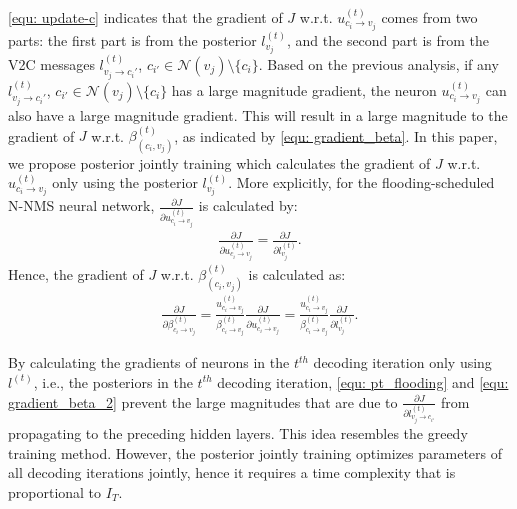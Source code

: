 \documentclass [PhD] {uclathes}
\begin{document}
\eqref{equ: update-c} indicates that the gradient of $J$ w.r.t. $u^{(t)}_{c_i\rightarrow v_j}$ comes from two parts: the first part is from the posterior $l^{(t)}_{v_j}$, and the second part is from the V2C messages $l^{(t)}_{v_j\rightarrow c_i'}$, $c_{i'}\in \mathcal{N}(v_j) \setminus \{c_i\}$. Based on the previous analysis, if any $l^{(t)}_{v_j\rightarrow c_i'}$, $c_{i'}\in \mathcal{N}(v_j) \setminus \{c_i\}$ has a large magnitude gradient, the neuron $u^{(t)}_{c_i\rightarrow v_j}$  can also have a large magnitude gradient. This will result in a large magnitude to the gradient of $J$ w.r.t. $\beta^{(t)}_{(c_i,v_j)}$, as indicated by \eqref{equ: gradient_beta}.  In this paper, we propose posterior jointly training which calculates the gradient of $J$ w.r.t. $u^{(t)}_{c_i\rightarrow v_j}$ only using the posterior $l^{(t)}_{v_j}$.  More explicitly, for the flooding-scheduled  N-NMS neural network, $\frac{\partial J}{\partial u^{(t)}_{c_i\rightarrow v_j}}$ is calculated by:
\begin{align}\label{equ: pt_flooding}
         \frac{\partial J}{\partial u^{(t)}_{c_i \rightarrow v_j}} = \frac{\partial J}{\partial l^{(t)}_{v_j}}.
\end{align}
Hence,  the gradient of $J$ w.r.t. $\beta^{(t)}_{(c_i,v_j)}$ is calculated as:
\begin{align}\label{equ: gradient_beta_2}
    \frac{\partial J}{\partial \beta^{(t)}_{c_i \rightarrow v_j}} = \frac{u^{(t)}_{c_i \rightarrow v_j}}{\beta^{(t)}_{c_i\rightarrow v_j}} \frac{\partial J}{\partial u^{(t)}_{c_i\rightarrow v_j}}=\frac{u^{(t)}_{c_i \rightarrow v_j}}{\beta^{(t)}_{c_i\rightarrow v_j}}\frac{\partial J}{\partial l^{(t)}_{v_j}}.
\end{align}

By calculating the gradients of neurons in the $t^{th}$ decoding iteration only using   $l^{(t)}$, i.e., the posteriors in the $t^{th}$ decoding iteration, \eqref{equ: pt_flooding} and \eqref{equ: gradient_beta_2} prevent the large magnitudes that are due to  $\frac{\partial J}{\partial l^{(t)}_{ v_j\rightarrow c_{i'} }}$ from propagating to the preceding hidden layers. This idea resembles the greedy training method. However, the posterior jointly training optimizes parameters of all decoding iterations  jointly, hence it requires a time complexity that is proportional to $I_T$. 
    
\end{document}
